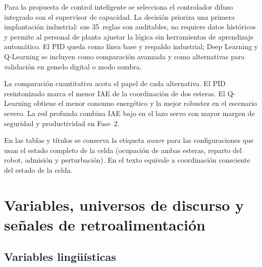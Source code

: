Para la propuesta de control inteligente se selecciona el controlador difuso integrado con el supervisor de capacidad. La decisión prioriza una primera implantación industrial: sus 35~reglas son auditables, no requiere datos históricos y permite al personal de planta ajustar la lógica sin herramientas de aprendizaje automático. El PID queda como línea base y respaldo industrial; Deep Learning y Q-Learning se incluyen como comparación avanzada y como alternativas para validación en gemelo digital o modo sombra.

La comparación cuantitativa acota el papel de cada alternativa. El PID resintonizado marca el menor IAE de la coordinación de dos esteras. El Q-Learning obtiene el menor consumo energético y la mejor robustez en el escenario severo. La red profunda combina IAE bajo en el lazo servo con mayor margen de seguridad y productividad en Fase~2.

En las tablas y títulos se conserva la etiqueta \emph{aware} para las configuraciones que usan el estado completo de la celda (ocupación de ambas esteras, reparto del robot, admisión y perturbación). En el texto equivale a coordinación consciente del estado de la celda.

\section{Variables, universos de discurso y señales de retroalimentación}

\subsection*{Variables lingüísticas}

